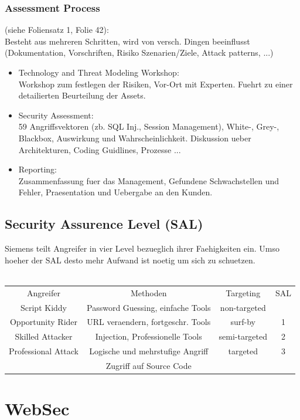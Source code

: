 \documentclass[a4paper, 12pt]{article}
\begin{document}
		\subsubsection{Assessment Process} 
		(siehe Foliensatz 1, Folie 42): \\
		Besteht aus mehreren Schritten, wird von versch. Dingen beeinflusst (Dokumentation, Vorschriften, Risiko Szenarien/Ziele, Attack patterns, ...)
		\begin{itemize}
			\item Technology and Threat Modeling Workshop: \\
			Workshop zum festlegen der Risiken, Vor-Ort mit Experten. Fuehrt zu einer detailierten Beurteilung der Assets.
			\item Security Assessment: \\
			59 Angriffsvektoren (zb. SQL Inj., Session Management), White-, Grey-, Blackbox, Auswirkung und Wahrscheinlichkeit. Diskussion ueber Architekturen, Coding Guidlines, Prozesse ...
			\item Reporting: \\
			Zusammenfassung fuer das Management, Gefundene Schwachstellen und Fehler, Praesentation und Uebergabe an den Kunden.
		\end{itemize}
	\subsection{Security Assurence Level (SAL)}
	Siemens teilt Angreifer in vier Level bezueglich ihrer Faehigkeiten ein.
	Umso hoeher der SAL desto mehr Aufwand ist noetig um sich zu schuetzen.
	\\\\
		\begin{tabular}{cccc}
			Angreifer & Methoden & Targeting & SAL \\
			Script Kiddy & Password Guessing, einfache Tools & non-targeted &  \\
			Opportunity Rider & URL veraendern, fortgeschr. Tools & surf-by & 1 \\
			Skilled Attacker & Injection, Professionelle Tools & semi-targeted & 2 \\
			Professional Attack & Logische und mehrstufige Angriff & targeted & 3 \\
			& Zugriff auf Source Code & & \\
		\end{tabular}

\section{WebSec}
\end{document}
